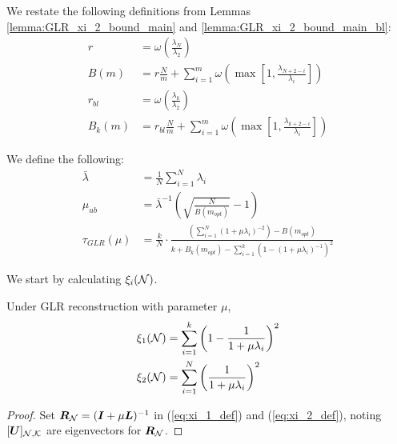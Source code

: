 We restate the following definitions from Lemmas \ref{lemma:GLR_xi_2_bound_main} and \ref{lemma:GLR_xi_2_bound_main_bl}:
\begin{align}
        r &= \omega\left( \frac{\lambda_{N}}{\lambda_{2}}\right) \\
        B(m) &= r \frac{N}{m} + \sum^{m}_{i=1}\omega\left(\max\left[1,\frac{\lambda_{N+2-i}}{\lambda_{i}}\right]\right) \\
        r_{bl} &= \omega\left( \frac{\lambda_{k}}{\lambda_{2}}\right) \\
        B_{k}(m) &= r_{bl} \frac{N}{m} + \sum^{m}_{i=1}\omega\left(\max\left[1,\frac{\lambda_{k+2-i}}{\lambda_{i}}\right]\right)
\end{align}


We define the following:
\begin{align}
    \bar{\lambda} &= \frac{1}{N}\sum_{i=1}^{N}\lambda_{i}\\
    \mu_{ub} &= \bar{\lambda}^{-1}\left(\sqrt{\frac{N}{B(m_{opt})}} -1\right)  \\
    \tau_{GLR}(\mu) &= \frac{k}{N} \cdot \frac{\left(\sum^{N}_{i=1}\left(1 + \mu\lambda_{i} \right)^{-2}\right) - B(m_{opt})}{k+B_{k}(m_{opt}) - \sum_{i=1}^{k} \left(1 - (1+\mu\lambda_{i})^{-1}\right)^{2}} 
\end{align}

We start by calculating $\xi_{i}(\mathcal{N})$.

\begin{lemma}
\label{lemma:GLR_full_observation_MSE}
  Under GLR reconstruction with parameter $\mu$,
    \begin{align}
        \xi_{1}(\mathcal{N}) &= \sum_{i=1}^{k} \left(1 - \frac{1}{1+\mu\lambda_{i}}\right)^{2} \\
         \xi_{2}(\mathcal{N}) &= \sum_{i=1}^{N} \left( \frac{1}{1+\mu\lambda_{i}}\right)^{2}
    \end{align}
\end{lemma}
\begin{proof}
    Set $\bm{R}_{\mathcal{N}}= (\bm{I} + \mu \bm{L})^{-1}$ in (\ref{eq:xi_1_def}) and (\ref{eq:xi_2_def}), noting $\matrsubU{N}$ are eigenvectors for $\bm{R}_{\mathcal{N}}$.
\end{proof}

